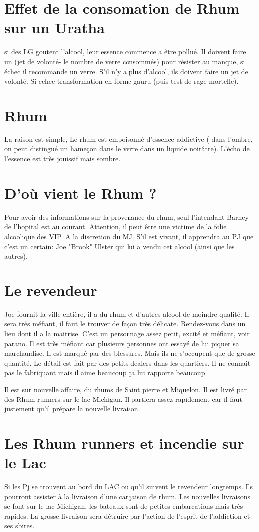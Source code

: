 \documentclass[oneside,12pt]{book}
\begin{document}
\begin{flushleft}
\section{Effet de la consomation de Rhum sur un Uratha}
si des LG goutent l'alcool, leur essence commence a être pollué. 
Il doivent faire un (jet de volonté- le nombre de verre consommés) pour résister au manque, si échec il recommande un verre. 
S'il n'y a plus d'alcool, ils doivent faire un jet de volonté.
Si echec transformation en forme gauru (puis test de rage mortelle). 

\section{Rhum}
La raison est simple, Le rhum est empoisonné d'essence addictive ( dans l'ombre, on peut distingué un hameçon dans le verre dans un liquide noirâtre).
L'écho de l'essence est très jouissif mais sombre. 

\section{D'où vient le Rhum ?}
Pour avoir des informations sur la provenance du rhum, seul l'intendant Barney de l'hopital est au courant. Attention, il peut être une victime de la folie alcoolique des VIP. A la discretion du MJ. S'il est vivant, il apprendra au PJ que c'est un certain: Joe "Brook" Ulster qui lui a vendu cet alcool (ainsi que les autres). 
\section{Le revendeur }
Joe fournit la ville entière, il a du rhum et d'autres alcool de moindre qualité. 
Il sera très méfiant, il faut le trouver de façon très délicate. Rendez-vous dans un lieu dont il a la maitrise.
C'est un personnage assez petit, excité et méfiant, voir parano.
Il est très méfiant car plusieurs personnes ont essayé de lui piquer sa marchandise. Il est marqué par des blessures. Mais ils ne s'occupent que de grosse quantité. Le détail est fait par des petits dealers dans les quartiers.
Il ne connait pas le fabriquant  mais il aime beaucoup ça lui rapporte beaucoup.

Il est sur nouvelle affaire, du rhums de Saint pierre et Miquelon. Il est livré par des Rhum runners sur le lac Michigan. Il partiera assez rapidement car il faut justement qu'il prépare la nouvelle livraison.
\section{Les Rhum runners et incendie sur le Lac}
Si les Pj se trouvent au bord du LAC ou qu'il suivent le revendeur longtemps. Ils pourront assister à la livraison d'une cargaison de rhum. 
Les nouvelles livraisons se font sur le lac Michigan, les bateaux sont de petites embarcations mais très rapides. La grosse livraison sera détruire par l'action de l'esprit de l'addiction et ses sbires.



\end{flushleft}
\end{document}
